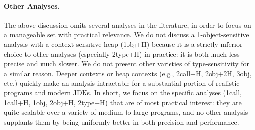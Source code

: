 \paragraph*{Other Analyses.}
The above discussion omits several analyses in the literature, in order to focus on a manageable set with practical relevance. We do not discuss a 1-object-sensitive analysis with a context-sensitive heap (1obj+H) because it is a strictly inferior choice to other analyses (especially 2type+H) in practice: it is both much less precise and much slower. We do not present other varieties of type-sensitivity for a similar reason. Deeper contexts or heap contexts (e.g., 2call+H, 2obj+2H, 3obj, etc.) quickly make an analysis intractable for a substantial portion of realistic programs and modern JDKs. In short, we focus on the specific analyses (1call, 1call+H, 1obj, 2obj+H, 2type+H) that are of most practical interest: they are quite scalable over a variety of medium-to-large programs, and no other analysis supplants them by being uniformly better in both precision and performance.